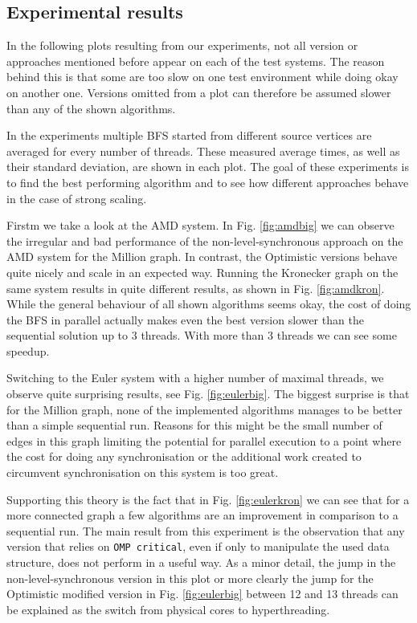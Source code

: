 \documentclass[letterpaper]{article}
\begin{document}
	\subsection{Experimental results}
		In the following plots resulting from our experiments, not all version or approaches mentioned before appear on each of the test systems. 
		The reason behind this is that some are too slow on one test environment while doing okay on another one.
		Versions omitted from a plot can therefore be assumed slower than any of the shown algorithms.
		
		In the experiments multiple BFS started from different source vertices are averaged for every number of threads. 
		These measured average times, as well as their standard deviation, are shown in each plot.
		The goal of these experiments is to find the best performing algorithm and to see how different approaches behave in the case of strong scaling. %

		Firstm we take a look at the AMD system.
		In Fig. \ref{fig:amdbig} we can observe the irregular and bad performance of the non-level-synchronous approach on the AMD system for the Million graph.
		In contrast, the Optimistic versions behave quite nicely and scale in an expected way.
		Running the Kronecker graph on the same system results in quite different results, as shown in Fig. \ref{fig:amdkron}.
		While the general behaviour of all shown algorithms seems okay, the cost of doing the BFS in parallel actually makes even the best version slower than the sequential solution up to 3 threads.
		With more than 3 threads we can see some speedup. 
		
		Switching to the Euler system with a higher number of maximal threads, we observe quite surprising results, see Fig. \ref{fig:eulerbig}.
		The biggest surprise is that for the Million graph, none of the implemented algorithms manages to be better than a simple sequential run.
		Reasons for this might be the small number of edges in this graph limiting the potential for parallel execution to a point where the cost for doing any synchronisation or the additional work created to circumvent synchronisation on this system is too great.

		Supporting this theory is the fact that in Fig. \ref{fig:eulerkron} we can see that for a more connected graph a few algorithms are an improvement in comparison to a sequential run.
		The main result from this experiment is the observation that any version that relies on \verb+OMP critical+, even if only to manipulate the used data structure, does not perform in a useful way.
		As a minor detail, the jump in the non-level-synchronous version in this plot or more clearly the jump for the Optimistic modified version in Fig. \ref{fig:eulerbig} between 12 and 13 threads can be explained as the switch from physical cores to hyperthreading.
\end{document}
